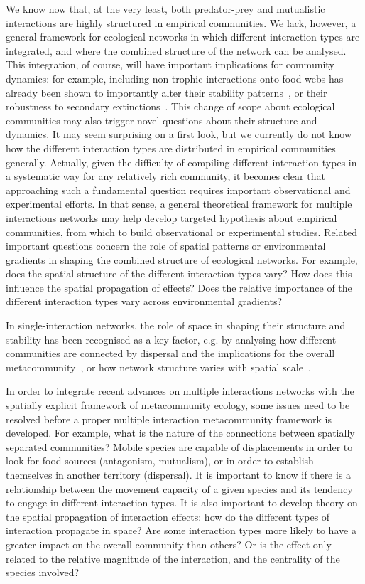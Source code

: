 We know now that, at the very least, both predator-prey and mutualistic interactions are highly structured in empirical communities. We lack, however, a general framework for ecological networks in which different interaction types are integrated, and where the combined structure of the network can be analysed. This integration, of course, will have important implications for community dynamics: for example, including non-trophic interactions onto food webs has already been shown to importantly alter their stability patterns~\citep{Kefi2012, Kefi2016a}, or their robustness to secondary extinctions~\citep{Pocock2012}. This change of scope about ecological communities may also trigger novel questions about their structure and dynamics. It may seem surprising on a first look, but we currently do not know how the different interaction types are distributed in empirical communities generally. Actually, given the difficulty of compiling different interaction types in a systematic way for any relatively rich community, it becomes clear that approaching such a fundamental question requires important observational and experimental efforts. In that sense, a general theoretical framework for multiple interactions networks may help develop targeted hypothesis about empirical communities, from which to build observational or experimental studies. Related important questions concern the role of spatial patterns or environmental gradients in shaping the combined structure of ecological networks. For example, does the spatial structure of the different interaction types vary? How does this influence the spatial propagation of effects? Does the relative importance of the different interaction types vary across environmental gradients?

In single-interaction networks, the role of space in shaping their structure and stability has been recognised as a key factor, e.g. by analysing how different communities are connected by dispersal and the implications for the overall metacommunity~\citep{Leibold2004}, or how network structure varies with spatial scale~\citep{Galiana2018}.

In order to integrate recent advances on multiple interactions networks with the spatially explicit framework of metacommunity ecology, some issues need to be resolved before a proper multiple interaction metacommunity framework is developed. For example, what is the nature of the connections between spatially separated communities? Mobile species are capable of displacements in order to look for food sources (antagonism, mutualism), or in order to establish themselves in another territory (dispersal). It is important to know if there is a relationship between the movement capacity of a given species and its tendency to engage in different interaction types. It is also important to develop theory on the spatial propagation of interaction effects: how do the different types of interaction propagate in space? Are some interaction types more likely to have a greater impact on the overall community than others? Or is the effect only related to the relative magnitude of the interaction, and the centrality of the species involved?

